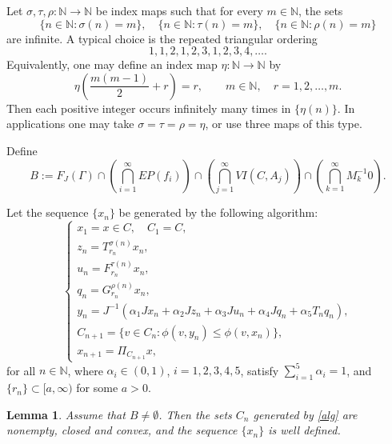 \documentclass[10pt,a4paper]{amsart}
\newtheorem{lemma}[theorem]{Lemma}
\numberwithin{equation}{section}
\begin{document}
Let $\sigma,\tau,\rho:\mathbb{N}\to\mathbb{N}$ be index maps such that for every $m\in\mathbb{N}$, the sets
\[
\{n\in\mathbb{N}:\sigma(n)=m\},\quad
\{n\in\mathbb{N}:\tau(n)=m\},\quad
\{n\in\mathbb{N}:\rho(n)=m\}
\]
are infinite. A typical choice is the repeated triangular ordering
\[
1,1,2,1,2,3,1,2,3,4,\ldots.
\]
Equivalently, one may define an index map $\eta:\mathbb N\to\mathbb N$ by
\[
\eta\left(\frac{m(m-1)}{2}+r\right)=r,
\qquad m\in\mathbb N,\quad r=1,2,\ldots,m.
\]
Then each positive integer occurs infinitely many times in $\{\eta(n)\}$. In applications one may take $\sigma=\tau=\rho=\eta$, or use three maps of this type.

Define
\begin{equation}\label{Bset}
B:=F_J(\Gamma)\cap\left(\bigcap_{i=1}^{\infty}EP(f_i)\right)
\cap\left(\bigcap_{j=1}^{\infty}VI(C,A_j)\right)
\cap\left(\bigcap_{k=1}^{\infty}M_k^{-1}0\right).
\end{equation}

Let the sequence $\{x_n\}$ be generated by the following algorithm:
\begin{equation}\label{alg}
\left\{
\begin{array}{ll}
x_1=x\in C,\quad C_1=C,\\[0.1cm]
z_n=T_{r_n}^{\sigma(n)}x_n,\\[0.1cm]
u_n=F_{r_n}^{\tau(n)}x_n,\\[0.1cm]
q_n=G_{r_n}^{\rho(n)}x_n,\\[0.1cm]
y_n=J^{-1}\left(\alpha_1Jx_n+\alpha_2Jz_n+\alpha_3Ju_n+\alpha_4Jq_n+\alpha_5T_nq_n\right),\\[0.1cm]
C_{n+1}=\{v\in C_n:\phi(v,y_n)\leq \phi(v,x_n)\},\\[0.1cm]
x_{n+1}=\Pi_{C_{n+1}}x,
\end{array}
\right.
\end{equation}
for all $n\in\mathbb{N}$, where $\alpha_i\in(0,1)$, $i=1,2,3,4,5$, satisfy $\sum_{i=1}^{5}\alpha_i=1$, and $\{r_n\}\subset[a,\infty)$ for some $a>0$.

\begin{lemma}\label{welldefined}
Assume that $B\neq\emptyset$. Then the sets $C_n$ generated by \eqref{alg} are nonempty, closed and convex, and the sequence $\{x_n\}$ is well defined.
\end{lemma}
\end{document}
